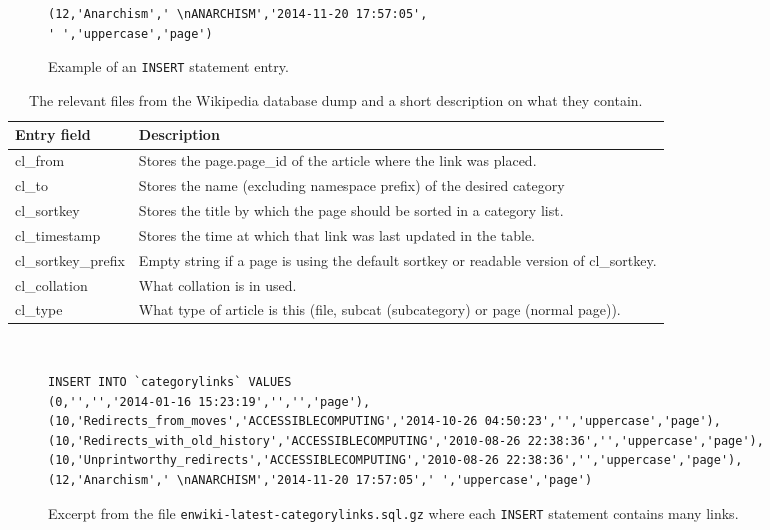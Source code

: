 \begin{figure}[h]
\centering
\begin{lstlisting}
(12,'Anarchism',' \nANARCHISM','2014-11-20 17:57:05',
' ','uppercase','page')
\end{lstlisting}
\caption{Example of an \texttt{INSERT} statement entry.}
\label{fig:entryexample}
\end{figure}


\begin{table}[ht]
\renewcommand{\arraystretch}{1.25}
\begin{tabularx}{\textwidth}{l|X}
\textbf{Entry field} &  \textbf{Description} \\ \hline
cl\_from & Stores the page.page\_id of the article where the link was placed. \\ \hline
cl\_to & Stores the name (excluding namespace prefix) of the desired category \\  \hline
cl\_sortkey & Stores the title by which the page should be sorted in a category list. \\ \hline
cl\_timestamp & Stores the time at which that link was last updated in the table. \\ \hline
cl\_sortkey\_prefix & Empty string if a page is using the default sortkey or readable version of cl\_sortkey. \\ \hline
cl\_collation & What collation is in used. \\ \hline
cl\_type & What type of article is this (file, subcat (subcategory) or page (normal page)).
\end{tabularx}
\\[10pt]
\caption[Relevant files from Wikipedia database dump]{The relevant files from the Wikipedia database dump and a short description on what they contain.}
\label{tab:insertdescription}
\end{table}


\begin{figure}[ht]
\begin{lstlisting}
INSERT INTO `categorylinks` VALUES 
(0,'','','2014-01-16 15:23:19','','','page'),
(10,'Redirects_from_moves','ACCESSIBLECOMPUTING','2014-10-26 04:50:23','','uppercase','page'),
(10,'Redirects_with_old_history','ACCESSIBLECOMPUTING','2010-08-26 22:38:36','','uppercase','page'),
(10,'Unprintworthy_redirects','ACCESSIBLECOMPUTING','2010-08-26 22:38:36','','uppercase','page'),
(12,'Anarchism',' \nANARCHISM','2014-11-20 17:57:05',' ','uppercase','page')
\end{lstlisting}
\caption[Excerpt from \texttt{enwiki-latest-categorylinks.sql.gz}]{Excerpt from the file \texttt{enwiki-latest-categorylinks.sql.gz} where each \texttt{INSERT} statement contains many links.}
\label{fig:categorylinks}
\end{figure}

